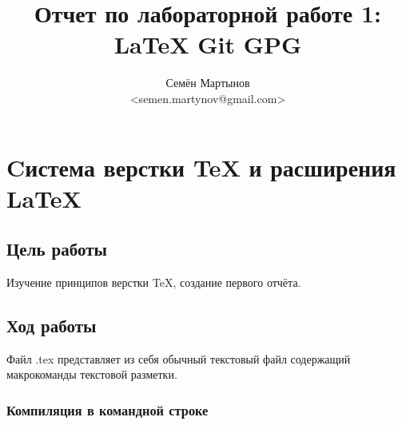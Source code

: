 \documentclass[a4paper, 12pt]{article}		%
\author{Семён Мартынов\\<semen.martynov@gmail.com>}
\title{Отчет по лабораторной работе 1:\\\LaTeX{} Git GPG}
\begin{document}
\maketitle
\tableofcontents{}

\newpage
\section{Cистема верстки \TeX{} и расширения \LaTeX{}}

\subsection{Цель работы}

Изучение принципов верстки \TeX{}, создание первого отчёта.

\subsection{Ход работы}

Файл .tex представляет из себя обычный текстовый файл содержащий макрокоманды текстовой разметки.

\subsubsection{Компиляция в командной строке}
\end{document}
